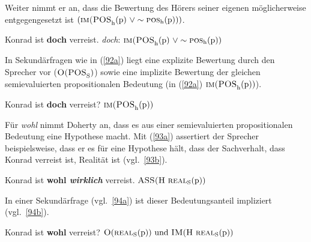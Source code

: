 Weiter nimmt er an, dass die Bewertung des Hörers seiner eigenen möglicherweise entgegengesetzt ist $(\textrm{\textsc{im(POS}}_{\textrm{h}}(\textrm{p}) \ \lor \sim\textrm{\textsc{pos}}_{\textrm{h}}(\textrm{p})))$.

\begin{exe}
	\ex\label{91} 
		\begin{xlist}	
			\ex\label{91a} Konrad ist \textbf{doch} verreist.
			\ex\label{91b} \textit{doch}: $\textrm{\textsc{im(POS}}_{\textrm{h}}(\textrm{p}) \ \lor \sim\textrm{\textsc{pos}}_{\textrm{h}}(\textrm{p}))$
			\hfill\hbox{\citet[106]{Doherty1987}}
		\end{xlist}
\end{exe}
In Sekundärfragen  wie in (\ref{92a}) liegt eine explizite Bewertung durch den Sprecher vor ($\textrm{\textsc{O(POS}}_{\textrm{S}})$) sowie eine implizite Bewertung der gleichen semievaluierten propositionalen Bedeutung (in (\ref{92a}) $\textrm{\textsc{im(POS}}_{\textrm{h}}(\textrm{p}))$).

\begin{exe}
	\ex\label{92} 
		\begin{xlist}	
			\ex\label{92a} Konrad ist \textbf{doch} verreist?
			\ex\label{92b} $\textrm{\textsc{im(POS}}_{\textrm{h}}(\textrm{p}))$
			\hfill\hbox{\citet[107]{Doherty1987}}
		\end{xlist}
\end{exe}
Für \textit{wohl} nimmt Doherty an, dass es aus einer semievaluierten propositionalen Bedeutung eine Hypothese macht. Mit (\ref{93a}) assertiert der Sprecher beispielsweise, dass er es für eine Hypothese hält, dass der Sachverhalt, dass Konrad verreist ist, Realität ist (vgl.\ \ref{93b}).
\begin{exe}
	\ex\label{93} 
		\begin{xlist}	
			\ex\label{93a} Konrad ist \textbf{wohl \textit{wirklich}} verreist.
			\ex\label{93b} $\textrm{\textsc{ASS(\textrm{H}}} \ \textrm{\textsc{real}}_{\textrm{S}}(\textrm{p}))$
			\hfill\hbox{\citet[112]{Doherty1987}}
		\end{xlist}
\end{exe}
In einer Sekundärfrage  (vgl.\ \ref{94a}) ist dieser Bedeutungsanteil impliziert (vgl.\ \ref{94b}).
\begin{exe}
	\ex\label{94} 
		\begin{xlist}	
			\ex\label{94a} Konrad ist \textbf{wohl} verreist?
			\ex\label{94b} $\textrm{\textsc{O}}(\textrm{\textsc{real}}_{\textrm{S}}(\textrm{p})) \ \textrm{und \textsc{IM}}(\textrm{\textsc{H}} \ \textrm{\textsc{real}}_{\textrm{S}}(\textrm{p}))$
			\hfill\hbox{\citet[112]{Doherty1987}}
		\end{xlist}
\end{exe}

